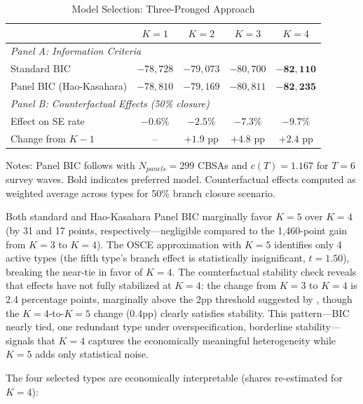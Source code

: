 \documentclass[12pt]{article}
\begin{document}
\begin{table}[H]
\centering
\caption{Model Selection: Three-Pronged Approach}
\label{tab:bic_selection}
\begin{threeparttable}
\begin{tabular}{lcccc}
\toprule
& $K=1$ & $K=2$ & $K=3$ & $K=4$ \\
\midrule
\multicolumn{5}{l}{\textit{Panel A: Information Criteria}} \\
Standard BIC & $-78,728$ & $-79,073$ & $-80,700$ & $\mathbf{-82,110}$ \\
Panel BIC (Hao-Kasahara) & $-78,810$ & $-79,169$ & $-80,811$ & $\mathbf{-82,235}$ \\
\midrule
\multicolumn{5}{l}{\textit{Panel B: Counterfactual Effects (50\% closure)}} \\
Effect on SE rate & $-0.6\%$ & $-2.5\%$ & $-7.3\%$ & $-9.7\%$ \\
Change from $K-1$ & -- & $+1.9$ pp & $+4.8$ pp & $+2.4$ pp \\
\bottomrule
\end{tabular}
\begin{tablenotes}
\small
\item Notes: Panel BIC follows \citet{hao2025} with $N_{panels} = 299$ CBSAs and $c(T) = 1.167$ for $T=6$ survey waves. Bold indicates preferred model. Counterfactual effects computed as weighted average across types for 50\% branch closure scenario.
\end{tablenotes}
\end{threeparttable}
\end{table}

Both standard and Hao-Kasahara Panel BIC marginally favor $K=5$ over $K=4$ (by 31 and 17 points, respectively---negligible compared to the 1,460-point gain from $K=3$ to $K=4$). The OSCE approximation with $K=5$ identifies only 4 active types (the fifth type's branch effect is statistically insignificant, $t = 1.50$), breaking the near-tie in favor of $K=4$. The counterfactual stability check reveals that effects have not fully stabilized at $K=4$: the change from $K=3$ to $K=4$ is 2.4 percentage points, marginally above the 2pp threshold suggested by \citet{bonhomme2022}, though the $K=4$-to-$K=5$ change (0.4pp) clearly satisfies stability. This pattern---BIC nearly tied, one redundant type under overspecification, borderline stability---signals that $K=4$ captures the economically meaningful heterogeneity while $K=5$ adds only statistical noise.

The four selected types are economically interpretable (shares re-estimated for $K=4$):
\end{document}
